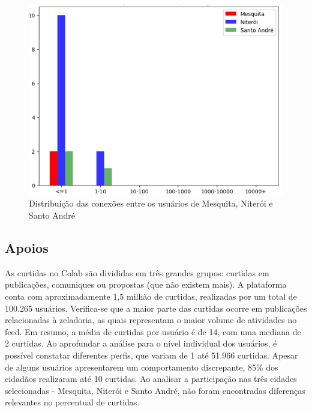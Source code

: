 \begin{figure}[!htb]
	\caption{Distribuição das conexões entre os usuários de Mesquita, Niterói e Santo André}
	\label{fig:colab_users_by_connections_on_cities}
	\centering
	\includegraphics[scale=0.7]{images/colab_users_by_connections_on_cities.png}
\end{figure}

\subsection*{Apoios}

As curtidas no Colab são divididas em três grandes grupos: curtidas em publicações, comuniques ou propostas (que não existem mais). A plataforma conta com aproximadamente 1,5 milhão de curtidas, realizadas por um total de 100.265 usuários. Verifica-se que a maior parte das curtidas ocorre em publicações relacionadas à zeladoria, as quais representam o maior volume de atividades no feed. Em resumo, a média de curtidas por usuário é de 14, com uma mediana de 2 curtidas. Ao aprofundar a análise para o nível individual dos usuários, é possível constatar diferentes perfis, que variam de 1 até 51.966 curtidas. Apesar de alguns usuários apresentarem um comportamento discrepante, 85\% dos cidadãos realizaram até 10 curtidas. Ao analisar a participação nas três cidades selecionadas - Mesquita, Niterói e Santo André, não foram encontradas diferenças relevantes no percentual de curtidas.

